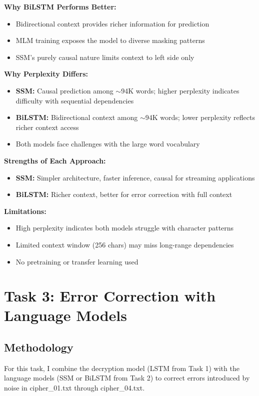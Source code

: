 \documentclass[12pt]{article}
\begin{document}
\textbf{Why BiLSTM Performs Better:}
\begin{itemize}
    \item Bidirectional context provides richer information for prediction
    \item MLM training exposes the model to diverse masking patterns
    \item SSM's purely causal nature limits context to left side only
\end{itemize}

\textbf{Why Perplexity Differs:}
\begin{itemize}
    \item \textbf{SSM:} Causal prediction among $\sim$94K words; higher perplexity indicates difficulty with sequential dependencies
    \item \textbf{BiLSTM:} Bidirectional context among $\sim$94K words; lower perplexity reflects richer context access
    \item Both models face challenges with the large word vocabulary
\end{itemize}

\textbf{Strengths of Each Approach:}
\begin{itemize}
    \item \textbf{SSM:} Simpler architecture, faster inference, causal for streaming applications
    \item \textbf{BiLSTM:} Richer context, better for error correction with full context
\end{itemize}

\textbf{Limitations:}
\begin{itemize}
    \item High perplexity indicates both models struggle with character patterns
    \item Limited context window (256 chars) may miss long-range dependencies
    \item No pretraining or transfer learning used
\end{itemize}

\section{Task 3: Error Correction with Language Models}

\subsection{Methodology}

For this task, I combine the decryption model (LSTM from Task 1) with the language models (SSM or BiLSTM from Task 2) to correct errors introduced by noise in cipher\_01.txt through cipher\_04.txt.
\end{document}
